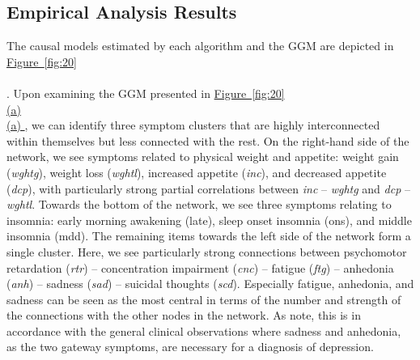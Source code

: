 \documentclass[twoside, 11pt]{article}
\newcommand*{\figref}[2][]{%
  \hyperref[{fig:#2}]{%
    Figure~\ref*{fig:#2}%
    \ifx\\#1\\%
    \else
      #1%
    \fi
  }%
}
\begin{document}
\subsection{Empirical Analysis Results} \label{empiricalresult}
The causal models estimated by each algorithm and the GGM are depicted in \figref[]{20}. Upon examining the GGM presented in \figref[(a)]{20}, we can identify three symptom clusters that are highly interconnected within themselves but less connected with the rest. On the right-hand side of the network, we see symptoms related to physical weight and appetite: weight gain (\textit{wghtg}), weight loss (\textit{wghtl}), increased appetite (\textit{inc}), and decreased appetite (\textit{dcp}), with particularly strong partial correlations between \textit{inc} -- \textit{wghtg} and \textit{dcp} -- \textit{wghtl}. Towards the bottom of the network, we see three symptoms relating to insomnia: early morning awakening (late), sleep onset insomnia (ons), and middle insomnia (mdd). The remaining items towards the left side of the network form a single cluster. Here, we see particularly strong connections between psychomotor retardation (\textit{rtr}) -- concentration impairment (\textit{cnc}) -- fatigue (\textit{ftg}) -- anhedonia (\textit{anh}) -- sadness (\textit{sad}) -- suicidal thoughts (\textit{scd}). Especially fatigue, anhedonia, and sadness can be seen as the most central in terms of the number and strength of the connections with the other nodes in the network. As \cite{mcnally_co-morbid_2017} note, this is in accordance with the general clinical observations where sadness and anhedonia, as the two gateway symptoms, are necessary for a diagnosis of depression. 
\end{document}
